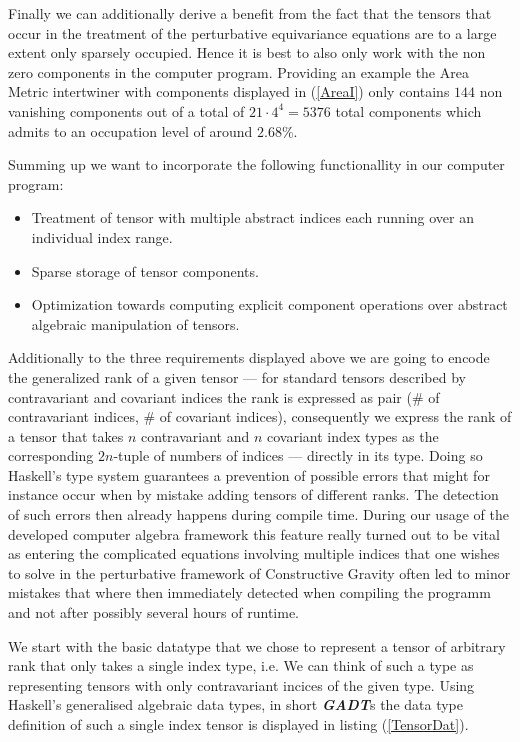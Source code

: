 \documentclass[a4paper,12pt, DIV=14, BCOR=5mm, twoside, headsepline, numbers=noenddot]{scrbook}
\begin{document}
Finally we can additionally derive a benefit from the fact that the tensors that occur in the treatment of the perturbative equivariance equations are to a large extent only sparsely occupied. Hence it is best to also only work with the non zero components in the computer program. Providing an example the Area Metric intertwiner with components displayed in (\ref{AreaI}) only contains $144$ non vanishing components out of a total of $21 \cdot 4^4 = 5376$ total components which admits to an occupation level of around $2.68 \%$.

Summing up we want to incorporate the following functionallity in our computer program:
\begin{itemize}
    \item Treatment of tensor with multiple abstract indices each running over an individual index range. 
    \item Sparse storage of tensor components.
    \item Optimization towards computing explicit component operations over abstract algebraic manipulation of tensors.
\end{itemize}

Additionally to the three requirements displayed above we are going to encode the generalized rank of a given tensor --- for standard tensors described by contravariant and covariant indices the rank is expressed as pair ($\#$ of contravariant indices, $\#$ of covariant indices), consequently we express the rank of a tensor that takes $n$ contravariant and $n$ covariant index types as the corresponding $2n$-tuple of numbers of indices --- directly in its type. Doing so Haskell's type system guarantees a prevention of possible errors that might for instance occur when by mistake adding tensors of different ranks. The detection of such errors then already happens during compile time. During our usage of the developed computer algebra framework this feature really turned out to be vital as entering the complicated equations involving multiple indices that one wishes to solve in the perturbative framework of Constructive Gravity often led to minor mistakes that where then immediately detected when compiling the programm and not after possibly several hours of runtime.

We start with the basic datatype that we chose to represent a tensor of arbitrary rank that only takes a single index type, i.e. We can think of such a type as representing tensors with only contravariant incices of the given type. Using Haskell's generalised algebraic data types, in short \textit{\textbf{GADT}}s the data type definition of such a single index tensor is displayed in listing (\ref{TensorDat}). 
\end{document}
